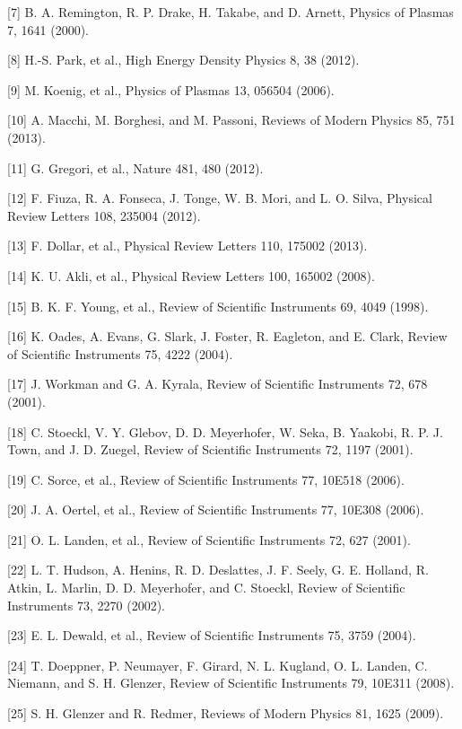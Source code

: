{[}7{]} B. A. Remington, R. P. Drake, H. Takabe, and D. Arnett, Physics of Plasmas 7, 1641 (2000).

{[}8{]} H.-S. Park, et al., High Energy Density Physics 8, 38 (2012).

{[}9{]} M. Koenig, et al., Physics of Plasmas 13, 056504 (2006).

{[}10{]} A. Macchi, M. Borghesi, and M. Passoni, Reviews of Modern Physics 85, 751 (2013).

{[}11{]} G. Gregori, et al., Nature 481, 480 (2012).

{[}12{]} F. Fiuza, R. A. Fonseca, J. Tonge, W. B. Mori, and L. O. Silva, Physical Review Letters 108, 235004 (2012).

{[}13{]} F. Dollar, et al., Physical Review Letters 110, 175002 (2013).

{[}14{]} K. U. Akli, et al., Physical Review Letters 100, 165002 (2008).

{[}15{]} B. K. F. Young, et al., Review of Scientific Instruments 69, 4049 (1998).

{[}16{]} K. Oades, A. Evans, G. Slark, J. Foster, R. Eagleton, and E. Clark, Review of Scientific Instruments 75, 4222 (2004).

{[}17{]} J. Workman and G. A. Kyrala, Review of Scientific Instruments 72, 678 (2001).

{[}18{]} C. Stoeckl, V. Y. Glebov, D. D. Meyerhofer, W. Seka, B. Yaakobi, R. P. J. Town, and J. D. Zuegel, Review of Scientific Instruments 72, 1197 (2001).

{[}19{]} C. Sorce, et al., Review of Scientific Instruments 77, 10E518 (2006).

{[}20{]} J. A. Oertel, et al., Review of Scientific Instruments 77, 10E308 (2006).

{[}21{]} O. L. Landen, et al., Review of Scientific Instruments 72, 627 (2001).

{[}22{]} L. T. Hudson, A. Henins, R. D. Deslattes, J. F. Seely, G. E. Holland, R. Atkin, L. Marlin, D. D. Meyerhofer, and C. Stoeckl, Review of Scientific Instruments 73, 2270 (2002).

{[}23{]} E. L. Dewald, et al., Review of Scientific Instruments 75, 3759 (2004).

{[}24{]} T. Doeppner, P. Neumayer, F. Girard, N. L. Kugland, O. L. Landen, C. Niemann, and S. H. Glenzer, Review of Scientific Instruments 79, 10E311 (2008).

{[}25{]} S. H. Glenzer and R. Redmer, Reviews of Modern Physics 81, 1625 (2009).

